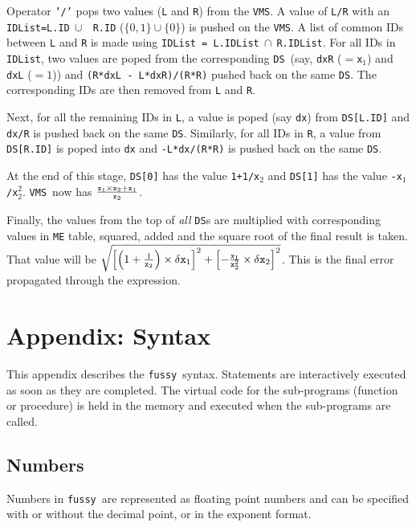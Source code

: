 \documentclass[acmtoms,acmnow]{acmtrans2m}
\newcommand{\Fussy}{{\tt fussy}}
\newcommand{\DS}{{\tt DS}}
\newcommand{\VMS}{{\tt VMS}}
\begin{document}
\begin{enumerate}
  Operator {\tt '/'} pops two values ({\tt L} and {\tt R}) from the
  \VMS.  A value of {\tt L/R} with an {\tt IDList=L.ID}$~\cup~${\tt
  R.ID} ($\{0,1\}\cup\{0\}$) is pushed on the \VMS.  A list of common
  IDs between {\tt L} and {\tt R} is made using {\tt IDList =
  L.IDList}$~\cap~${\tt R.IDList}.  For all IDs in {\tt IDList}, two
  values are poped from the corresponding \DS\ (say, {\tt dxR}
  ({\tt $=$x$_1$}) and {\tt dxL} ($=1$)) and {\tt (R*dxL -
  L*dxR)/(R*R)} pushed back on the same \DS.  The corresponding
  IDs are then removed from {\tt L} and {\tt R}.
  
  Next, for all the remaining IDs in {\tt L}, a value is poped (say
  {\tt dx}) from {\tt DS[L.ID]} and {\tt dx/R} is pushed back on the
  same \DS.  Similarly, for all IDs in {\tt R}, a value from {\tt
  DS[R.ID]} is poped into {\tt dx} and {\tt -L*dx/(R*R)} is pushed
  back on the same \DS.
  
  At the end of this stage, {\tt DS[0]} has the value {\tt 1+1/x$_2$}
  and {\tt DS[1]} has the value {\tt -x$_1$/x$_2^2$}.  \VMS\ now has
  ${{\tt x}_1 \times {\tt x}_2 + {\tt x}_1 \over {\tt x}_2}$.
       
\end{enumerate}

Finally, the values from the top of {\it all} \DS s are multiplied
with corresponding values in {\tt ME} table, squared, added and the
square root of the final result is taken.  That value will be
$\sqrt{\left[\left(1+{1\over {\tt x}_2}\right) \times \delta {\tt
x}_1\right]^2+\left[-{{\tt x}_1 \over {\tt x}_2^2} \times \delta {\tt
x}_2\right]^2}$.  This is the final error propagated through the
expression.

\section{Appendix: Syntax}
\label{APPEN:SYNTAX}

This appendix describes the \Fussy\ syntax.  Statements are
interactively executed as soon as they are completed.  The virtual
code for the sub-programs (function or procedure) is held in the
memory and executed when the sub-programs are called.

\subsection{Numbers}
\label{NUMBERS}
Numbers in \Fussy\ are represented as floating point numbers and can
be specified with or without the decimal point, or in the exponent
format.
\end{document}
